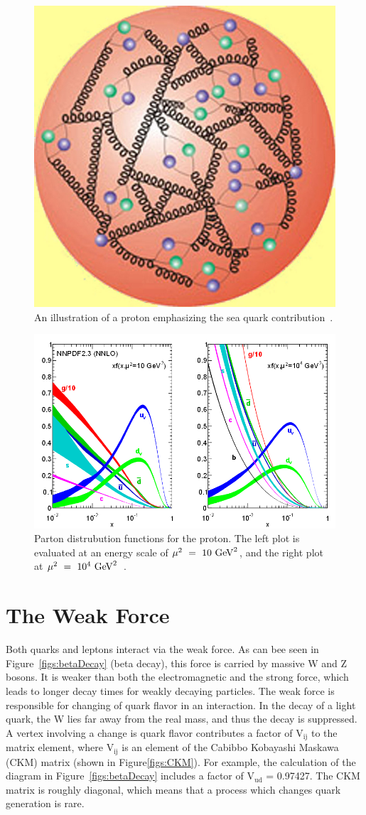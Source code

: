 \begin{figure}
\begin{center}
\includegraphics[width=0.4\linewidth]{figs/partons.jpg}
\caption{An illustration of a proton emphasizing the sea quark contribution~\cite{fnal}.}
\label{figs:partons}
\end{center}
\end{figure}

\begin{figure}
\begin{center}
\includegraphics[width=.8\linewidth]{figs/pdfs.png}
\caption{Parton distrubution functions for the proton.  The left plot is evaluated at an energy scale of $\mathrm{\mu^{2}~=~10~\mathrm{GeV}^{2}}$, and the 
right plot at $\mathrm{\mu^{2}~=~10^{4}~\mathrm{GeV}^{2}}$~\cite{PDG-2014}.   }
\label{figs:pdfs}
\end{center}
\end{figure}


\section{The Weak Force}
\label{sec:weaktheory}
Both quarks and leptons interact via the weak force.  As can bee seen in Figure~\ref{figs:betaDecay} (beta decay), this force is 
carried by massive W and Z bosons.  
It is weaker than both the electromagnetic and the strong force, which leads to longer decay times for weakly decaying particles.  
The weak force is responsible for changing of quark flavor in an interaction.  
In the decay of a light quark, the W lies far away from the real mass, and thus the decay is suppressed.  
A vertex involving a change is quark flavor contributes a factor of $\mathrm{V_{ij}}$ to the 
matrix element, where $\mathrm{V_{ij}}$ is an element of the Cabibbo Kobayashi Maskawa (CKM) matrix 
(shown in Figure\ref{figs:CKM}).  
For example, the calculation of the diagram in Figure~\ref{figs:betaDecay} includes a factor of $\mathrm{V_{ud}}$ = 0.97427.  
The CKM matrix is roughly diagonal, which means that a process which changes quark generation is rare.  

